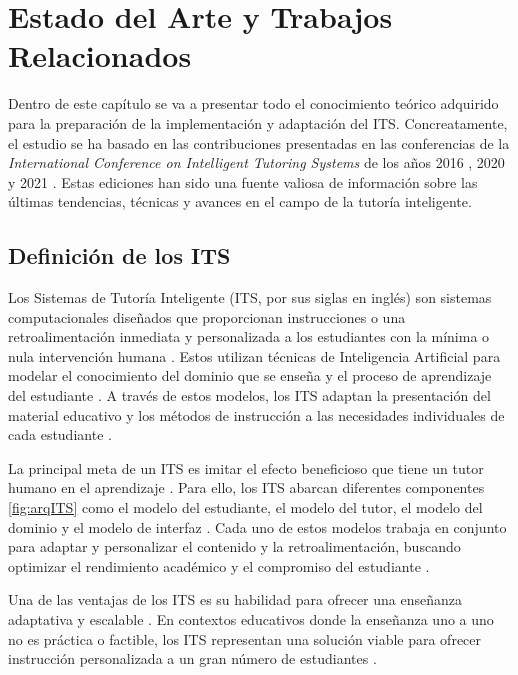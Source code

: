 \chapter{Estado del Arte y Trabajos Relacionados} \label{chap:state_of_the_art}

Dentro de este capítulo se va a presentar todo el conocimiento teórico adquirido para la preparación de la implementación y adaptación del ITS. Concreatamente, el estudio se ha basado en las contribuciones presentadas en las conferencias de la \textit{International Conference on Intelligent Tutoring Systems} de los años 2016 \cite{ITS2016}, 2020 \cite{ITS2020} y 2021 \cite{ITS2021}. Estas ediciones han sido una fuente valiosa de información sobre las últimas tendencias, técnicas y avances en el campo de la tutoría inteligente. 

\section{Definición de los ITS}

Los Sistemas de Tutoría Inteligente (ITS, por sus siglas en inglés) son sistemas computacionales diseñados que proporcionan instrucciones o una retroalimentación inmediata y personalizada a los estudiantes con la mínima o nula intervención humana \cite{Woolf2009}. Estos utilizan técnicas de Inteligencia Artificial para modelar el conocimiento del dominio que se enseña y el proceso de aprendizaje del estudiante \cite{Aleven2016}. A través de estos modelos, los ITS adaptan la presentación del material educativo y los métodos de instrucción a las necesidades individuales de cada estudiante \cite{Nwana1990}.

La principal meta de un ITS es imitar el efecto beneficioso que tiene un tutor humano en el aprendizaje \cite{VanLehn2011}. Para ello, los ITS abarcan diferentes componentes \ref{fig:arqITS} como el modelo del estudiante, el modelo del tutor, el modelo del dominio y el modelo de interfaz \cite{Koedinger1997}. Cada uno de estos modelos trabaja en conjunto para adaptar y personalizar el contenido y la retroalimentación, buscando optimizar el rendimiento académico y el compromiso del estudiante \cite{Durlach2008}.

Una de las ventajas de los ITS es su habilidad para ofrecer una enseñanza adaptativa y escalable \cite{Murray2003}. En contextos educativos donde la enseñanza uno a uno no es práctica o factible, los ITS representan una solución viable para ofrecer instrucción personalizada a un gran número de estudiantes \cite{Graesser2009}.


